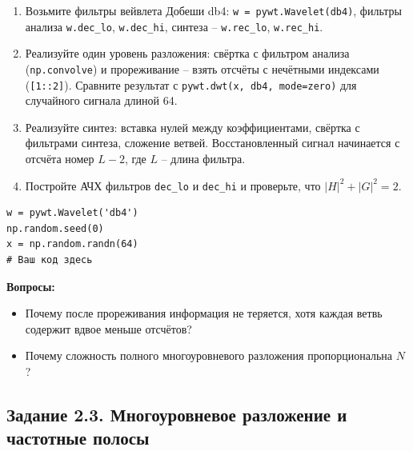 \documentclass[12pt,a4paper,openany]{book}
\providecommand{\tightlist}{\setlength{\itemsep}{0pt}\setlength{\parskip}{0pt}}
\begin{document}
\begin{enumerate}
\def\labelenumi{\arabic{enumi}.}
\tightlist
\item
  Возьмите фильтры вейвлета Добеши db4: \texttt{w\ =\allowbreak{}\ pywt.\allowbreak{}Wavelet(\allowbreak{}\textquotesingle{}\allowbreak{}db4\textquotesingle{}\allowbreak{})}, фильтры анализа \texttt{w.\allowbreak{}dec\_\allowbreak{}lo}, \texttt{w.\allowbreak{}dec\_\allowbreak{}hi}, синтеза -- \texttt{w.\allowbreak{}rec\_\allowbreak{}lo}, \texttt{w.\allowbreak{}rec\_\allowbreak{}hi}.
\item
  Реализуйте один уровень разложения: свёртка с фильтром анализа (\texttt{np.\allowbreak{}convolve}) и прореживание -- взять отсчёты с нечётными индексами (\texttt{{[}1:\allowbreak{}:\allowbreak{}2{]}}). Сравните результат с \texttt{pywt.\allowbreak{}dwt(\allowbreak{}x,\allowbreak{}\ \textquotesingle{}\allowbreak{}db4\textquotesingle{}\allowbreak{},\allowbreak{}\ mode=\allowbreak{}\textquotesingle{}\allowbreak{}zero\textquotesingle{}\allowbreak{})} для случайного сигнала длиной 64.
\item
  Реализуйте синтез: вставка нулей между коэффициентами, свёртка с фильтрами синтеза, сложение ветвей. Восстановленный сигнал начинается с отсчёта номер \(L - 2\), где \(L\) -- длина фильтра.
\item
  Постройте АЧХ фильтров \texttt{dec\_\allowbreak{}lo} и \texttt{dec\_\allowbreak{}hi} и проверьте, что \(|H|^2 + |G|^2 = 2\).
\end{enumerate}

\begin{Verbatim}[fontsize=\small, breaklines, breakanywhere, frame=single, framesep=2mm]
w = pywt.Wavelet('db4')
np.random.seed(0)
x = np.random.randn(64)
# Ваш код здесь
\end{Verbatim}

\textbf{Вопросы:}

\begin{itemize}
\tightlist
\item
  Почему после прореживания информация не теряется, хотя каждая ветвь содержит вдвое меньше отсчётов?
\item
  Почему сложность полного многоуровневого разложения пропорциональна \(N\)?
\end{itemize}

\subsection*{Задание 2.3. Многоуровневое разложение и частотные полосы}
\end{document}
